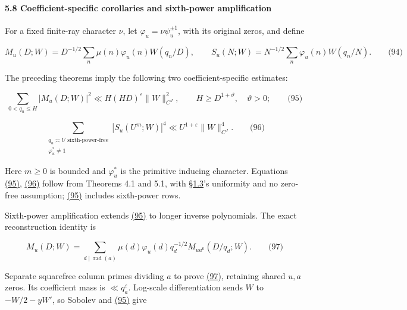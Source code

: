 \hypertarget{coefficient-specific-corollaries-and-sixth-power-amplification}{%
\paragraph{5.8 Coefficient-specific corollaries and sixth-power amplification}\label{coefficient-specific-corollaries-and-sixth-power-amplification}}

For a fixed finite-ray character \(\nu\), let \(\varphi_u=\nu\psi_u^{\pm1}\), with its original zeros, and define

\hypertarget{cf:eq:3.1}{}

\label{cf:eq:3.1}

\[
M_u(D;W)=D^{-1/2}\sum_n\mu(n)\varphi_u(n)W(q_n/D),\qquad
 S_u(N;W)=N^{-1/2}\sum_n\varphi_u(n)W(q_n/N).
\qquad\text{(94)}
\]

The preceding theorems imply the following two coefficient-specific estimates:

\hypertarget{cf:eq:3.2}{}

\label{cf:eq:3.2}

\[
\sum_{0<q_u\le H}|M_u(D;W)|^2\ll H(HD)^\varepsilon\|W\|_{C^J}^2,
 \qquad H\ge D^{1+\vartheta},\quad \vartheta>0;
\qquad\text{(95)}
\]

\hypertarget{cf:eq:3.3}{}

\label{cf:eq:3.3}

\[
\sum_{\substack{q_u\asymp U\text{ sixth-power-free}\\\varphi_u^*\ne1}}
 |S_u(U^m;W)|^4\ll U^{1+\varepsilon}\|W\|_{C^J}^4.
\qquad\text{(96)}
\]

Here \(m\ge0\) is bounded and \(\varphi_u^*\) is the primitive inducing character. Equations \protect\hyperlink{cf:eq:3.2}{(95)}, \protect\hyperlink{cf:eq:3.3}{(96)} follow from Theorems 4.1 and 5.1, with §\protect\hyperlink{cf:sec:1.2}{1.3}'s uniformity and no zero-free assumption; \protect\hyperlink{cf:eq:3.2}{(95)} includes sixth-power rows.

Sixth-power amplification extends \protect\hyperlink{cf:eq:3.2}{(95)} to longer inverse polynomials. The exact reconstruction identity is

\hypertarget{cf:eq:3.4}{}

\label{cf:eq:3.4}

\[
M_u(D;W)=\sum_{d\mid\operatorname{rad}(a)}
 \mu(d)\varphi_u(d)q_d^{-1/2}M_{ua^6}(D/q_d;W).
\qquad\text{(97)}
\]

Separate squarefree column primes dividing \(a\) to prove \protect\hyperlink{cf:eq:3.4}{(97)}, retaining shared \(u,a\) zeros. Its coefficient mass is \(\ll q_a^\varepsilon\). Log-scale differentiation sends \(W\) to \(-W/2-yW'\), so Sobolev and \protect\hyperlink{cf:eq:3.2}{(95)} give

